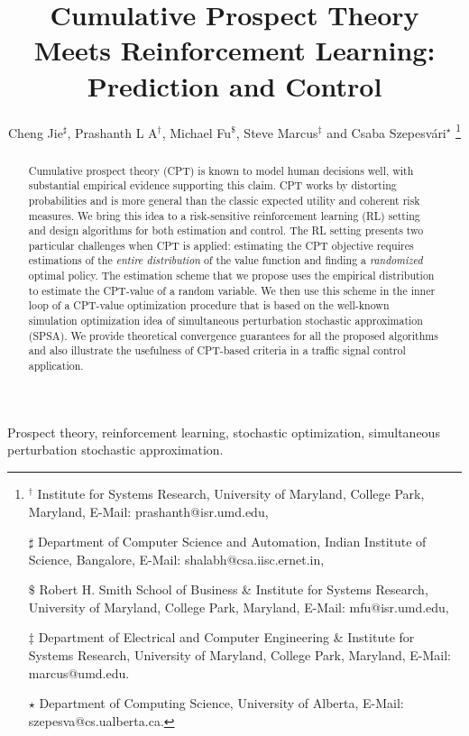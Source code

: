 \documentclass[twocolumn]{IEEEtran}
\begin{document}
\title{Cumulative Prospect Theory Meets Reinforcement Learning: Prediction and Control}
\author{Cheng Jie$^\sharp$, Prashanth L A$^\dagger$, Michael Fu$^\$$, Steve Marcus$^\ddag$ and Csaba Szepesv\'ari$^\star$
\thanks{
$^\dagger$ Institute for Systems Research, University of Maryland, College Park, Maryland,
E-Mail: prashanth@isr.umd.edu,

$\sharp$ Department of Computer Science and Automation,
Indian Institute of Science, Bangalore,
E-Mail: shalabh@csa.iisc.ernet.in, 

$\$$ Robert H. Smith School of Business \& Institute for Systems Research,
University of Maryland, College Park, Maryland,
E-Mail: mfu@isr.umd.edu,

$\ddag$ Department of Electrical and Computer Engineering \& Institute for Systems Research,
University of Maryland, College Park, Maryland,
 E-Mail: marcus@umd.edu.

$\star$ Department of Computing Science,
University of Alberta,
 E-Mail: szepesva@cs.ualberta.ca.
}}
\maketitle


\begin{abstract}
Cumulative prospect theory (CPT) is known to model human decisions well, with substantial empirical evidence supporting this claim. 
CPT works by distorting probabilities and is more general than the classic expected utility and coherent risk measures. We bring this idea to a risk-sensitive reinforcement learning (RL) setting and design algorithms for both estimation and control.
The RL setting presents two particular challenges when CPT is applied: estimating the CPT objective requires estimations of the {\it entire distribution} of the value function and finding a {\it randomized} optimal policy.
The estimation scheme that we propose uses the empirical distribution to estimate the CPT-value of a random variable. We then use this scheme in the inner loop of a CPT-value optimization procedure that is based on the well-known simulation optimization idea of simultaneous perturbation stochastic approximation (SPSA).
We provide theoretical convergence guarantees for all the proposed algorithms and also 
illustrate the usefulness of CPT-based criteria in a traffic signal control application.
\end{abstract}

\begin{IEEEkeywords}
Prospect theory, reinforcement learning, stochastic optimization, simultaneous perturbation stochastic approximation.
\end{IEEEkeywords}
\end{document}

